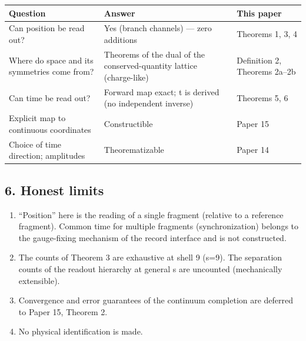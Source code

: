 \documentclass[
]{article}
\newcounter{none} %
\providecommand{\tightlist}{%
  \setlength{\itemsep}{0pt}\setlength{\parskip}{0pt}}
\begin{document}
{\def\LTcaptype{none} %
\begin{longtable}[]{@{}
  >{\raggedright\arraybackslash}p{}
  >{\raggedright\arraybackslash}p{}
  >{\raggedright\arraybackslash}p{}@{}}
\toprule\noalign{}
\begin{minipage}[b]{\linewidth}\raggedright
Question
\end{minipage} & \begin{minipage}[b]{\linewidth}\raggedright
Answer
\end{minipage} & \begin{minipage}[b]{\linewidth}\raggedright
This paper
\end{minipage} \\
\midrule\noalign{}
\endhead
\bottomrule\noalign{}
\endlastfoot
Can position be read out? & Yes (branch channels) --- zero additions &
Theorems 1, 3, 4 \\
Where do space and its symmetries come from? & Theorems of the dual of
the conserved-quantity lattice (charge-like) & Definition 2, Theorems
2a--2b \\
Can time be read out? & Forward map exact; t is derived (no independent
inverse) & Theorems 5, 6 \\
Explicit map to continuous coordinates & Constructible & Paper 15 \\
Choice of time direction; amplitudes & Theorematizable & Paper 14 \\
\end{longtable}
}

\subsection{6. Honest limits}\label{honest-limits}

\begin{enumerate}
\def\labelenumi{\arabic{enumi}.}
\tightlist
\item
  ``Position'' here is the reading of a single fragment (relative to a
  reference fragment). Common time for multiple fragments
  (synchronization) belongs to the gauge-fixing mechanism of the record
  interface and is not constructed.
\item
  The counts of Theorem 3 are exhaustive at shell 9 (s=9). The
  separation counts of the readout hierarchy at general s are uncounted
  (mechanically extensible).
\item
  Convergence and error guarantees of the continuum completion are
  deferred to Paper 15, Theorem 2.
\item
  No physical identification is made.
\end{enumerate}
\end{document}
